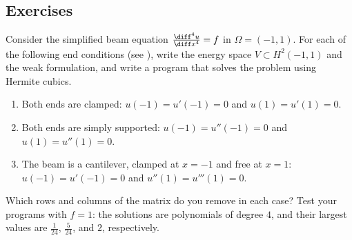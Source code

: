 \subsection*{Exercises}
\begin{exercises}
    \ex Consider the simplified beam equation $\frac{\diff^4 u}{\diff x^4} = f$ in $\Omega=(-1,1)$.
    For each of the following end conditions (see ), write the energy space $V \subset H^2(-1,1)$ and the weak formulation,
    and write a program that solves the problem using Hermite cubics.
    \begin{enumerate}[label=\roman*)]
        \item Both ends are clamped: $u(-1) = u'(-1) = 0$ and $u(1) = u'(1) = 0$.
        \item Both ends are simply supported: $u(-1) = u''(-1) = 0$ and $u(1) = u''(1) = 0$.
        \item The beam is a cantilever, clamped at $x = -1$ and free at $x = 1$: \\ $u(-1) = u'(-1) = 0$ and $u''(1) = u'''(1) = 0$.
    \end{enumerate}
    Which rows and columns of the matrix do you remove in each case?
    Test your programs with $f = 1$: the solutions are polynomials of degree $4$, and their largest values are $\frac 1 {24}$, $\frac 5 {24}$, and $2$, respectively.
\end{exercises}